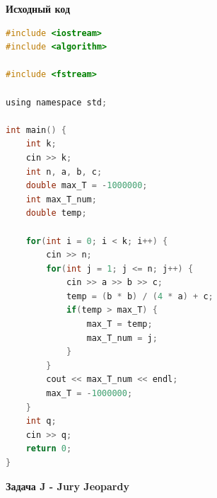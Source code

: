 \documentclass[a4paper,12pt]{article}
\begin{document}
\textbf{{\large Исходный код}} \\
\begin{lstlisting}[language=C]
#include <iostream>
#include <algorithm>

#include <fstream>

using namespace std;

int main() {
    int k;
    cin >> k;
    int n, a, b, c;
    double max_T = -1000000;
    int max_T_num;
    double temp;

    for(int i = 0; i < k; i++) {
        cin >> n;
        for(int j = 1; j <= n; j++) {
            cin >> a >> b >> c;
            temp = (b * b) / (4 * a) + c;
            if(temp > max_T) {
                max_T = temp;
                max_T_num = j;
            }
        }
        cout << max_T_num << endl;
        max_T = -1000000;
    }
	int q;
	cin >> q;
    return 0;
}
\end{lstlisting}

\newpage
\textbf{{\large Задача J - Jury Jeopardy}}
\end{document}
